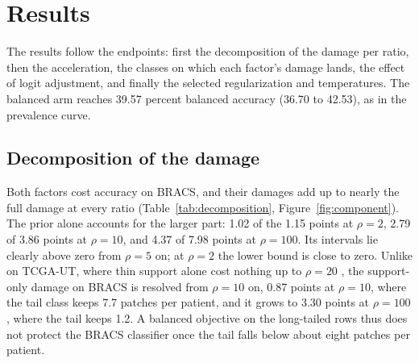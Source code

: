 \section{Results}
\label{sec:results}
The results follow the endpoints: first the decomposition of the damage per ratio, then the acceleration, the classes on which each factor's damage lands, the effect of logit adjustment, and finally the selected regularization and temperatures. The balanced arm reaches 39.57 percent balanced accuracy (36.70 to 42.53), as in the prevalence curve.

\subsection{Decomposition of the damage}
\label{sec:decomposition-results}
Both factors cost accuracy on BRACS, and their damages add up to nearly the full damage at every ratio (Table~\ref{tab:decomposition}, Figure~\ref{fig:component}). The prior alone accounts for the larger part: 1.02 of the 1.15 points at $\rho=2$, 2.79 of 3.86 points at $\rho=10$, and 4.37 of 7.98 points at $\rho=100$. Its intervals lie clearly above zero from $\rho=5$ on; at $\rho=2$ the lower bound is close to zero. Unlike on TCGA-UT, where thin support alone cost nothing up to $\rho=20$ \citep{queisler2026causeTcga}, the support-only damage on BRACS is resolved from $\rho=10$ on, 0.87 points at $\rho=10$, where the tail class keeps 7.7 patches per patient, and it grows to 3.30 points at $\rho=100$, where the tail keeps 1.2. A balanced objective on the long-tailed rows thus does not protect the BRACS classifier once the tail falls below about eight patches per patient.


